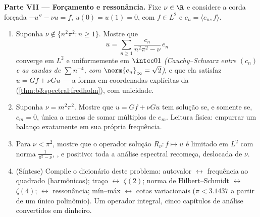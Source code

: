 \begin{problem}
\medskip
\noindent\textbf{Parte VII --- Forçamento e ressonância.} Fixe $\nu \in \R$ e
considere a corda forçada $-u'' - \nu u =
f$, $u(0) = u(1) = 0$, com $f \in L^2$ e $c_n = \langle
e_n, f\rangle$.
\begin{enumerate}[resume]
  \item Suponha $\nu \notin \{n^2\pi^2 : n \geq 1\}$. Mostre que
        \[
        u = \sum_{n\geq1}\frac{c_n}{n^2\pi^2 - \nu}\,e_n
        \]
        converge em $L^2$ e uniformemente em $\intcc01$
        \emph{(Cauchy--Schwarz entre $(c_n)$ e as caudas de $\sum n^{-4}$,
        com $\norm{e_n}_\infty =
        \sqrt2$)}, e que ela satisfaz $u = Gf + \nu Gu$ --- a forma em
        coordenadas explícitas da 
        (\cref{thm:b3:spectral:fredholm}), com unicidade.
  \item Suponha $\nu = m^2\pi^2$. Mostre que $u = Gf + \nu
        Gu$ tem solução se, e somente se,
        $c_m = 0$, única a menos de somar múltiplos de $e_m$. Leitura
        física: empurrar um balanço exatamente em sua própria
        frequência.
  \item Para $\nu < \pi^2$, mostre que o operador solução $R_\nu\colon f \mapsto u$ é limitado em
        $L^2$ com norma $\frac1{\pi^2 - \nu}$, ,  e positivo:
        toda a análise espectral recomeça, deslocada de $\nu$.
  \item (Síntese) Compile o dicionário deste problema: autovalor $\leftrightarrow$
        frequência ao quadrado (harmônicos); traço $\leftrightarrow$ $\zeta(2)$; norma de
        Hilbert--Schmidt $\leftrightarrow$ $\zeta(4)$;  $\leftrightarrow$
        ressonância; mín--máx $\leftrightarrow$ cotas variacionais ($\pi <
        3.1437$ a partir de
        um único polinômio). Um operador integral, cinco capítulos de
        análise convertidos em dinheiro.
\end{enumerate}


\end{problem}
